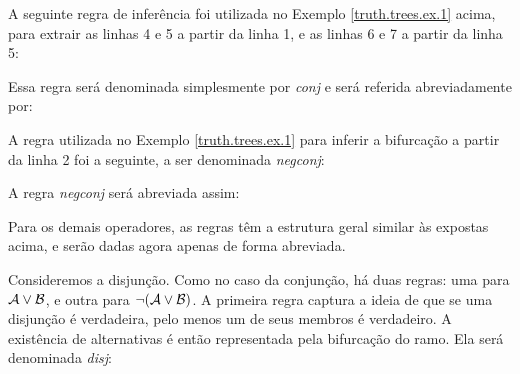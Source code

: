 A seguinte regra de inferência foi utilizada no Exemplo \ref{truth.trees.ex.1} acima, para extrair as linhas 4 e 5 a partir da linha 1, e as linhas 6 e 7 a partir da linha 5:


Essa regra será denominada simplesmente por \emph{conj} e será referida abreviadamente por:



A regra utilizada no Exemplo \ref{truth.trees.ex.1}  para inferir a bifurcação a partir da linha 2 foi a seguinte, a ser denominada \emph{negconj}:


A regra \emph{negconj} será abreviada assim:

Para os demais operadores, as regras têm a estrutura geral similar às expostas acima, e serão dadas agora apenas de forma abreviada. 

Consideremos a disjunção. 
Como no caso da conjunção, há duas regras: uma para $\mathcal{A} \vee \mathcal{B}$, e outra para $\neg(\mathcal{A} \vee \mathcal{B})$. 
A primeira regra captura a ideia de que se uma disjunção é verdadeira, pelo menos um de seus membros é verdadeiro.
A existência de alternativas é então representada pela bifurcação do ramo. 
Ela será denominada \emph{disj}:

